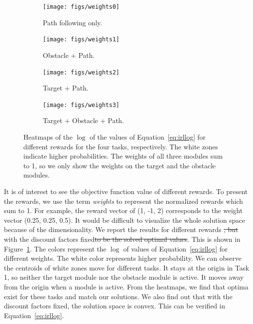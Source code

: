 \documentclass[12pt]{report}	%
\theoremstyle{definition}
\theoremstyle{remark}
\providecommand{\DIFdel}[1]{{\protect\color{red}\sout{#1}}}                      %
\providecommand{\DIFdelbegin}{} %
\providecommand{\DIFdelend}{} %
\providecommand{\DIFaddbeginFL}{} %
\providecommand{\DIFaddendFL}{} %
\providecommand{\DIFdelbeginFL}{} %
\providecommand{\DIFdelendFL}{} %
\begin{document}
\begin{figure}
\centering
\begin{subfigure}[b]{0.49\textwidth}
\DIFdelbeginFL %
\DIFdelendFL \DIFaddbeginFL \texttt{[image: figs/weights0]}
\DIFaddendFL \caption{Path following only.}
\end{subfigure}
\begin{subfigure}[b]{0.49\textwidth}
\DIFdelbeginFL %
\DIFdelendFL \DIFaddbeginFL \texttt{[image: figs/weights1]}
\DIFaddendFL \caption{Obstacle + Path. }
\end{subfigure}
\begin{subfigure}[b]{0.49\textwidth}
\DIFdelbeginFL %
\DIFdelendFL \DIFaddbeginFL \texttt{[image: figs/weights2]}
\DIFaddendFL \caption{Target + Path. }
\end{subfigure}
\begin{subfigure}[b]{0.49\textwidth}
\DIFdelbeginFL %
\DIFdelendFL \DIFaddbeginFL \texttt{[image: figs/weights3]}
\DIFaddendFL \caption{Target + Obstacle + Path. }
\end{subfigure}
\caption{Heatmaps of the $\log$ of the values of Equation~\ref{eq:irllog} for
different rewards for the four tasks, respectively. The white zones indicate
higher probabilities. The weights of all three modules sum to 1, so we only show
the weights on the target and the obstacle modules.
}
\label{fig:heatmap}
\end{figure}

It is of interest to see the objective function value of different rewards. To
present the rewards, we use the term \textit{weights} to represent the
normalized rewards which sum to 1. For example, the reward vector of (1, -1, 2)
corresponds to the weight vector (0.25, 0.25, 0.5). It would be difficult to
visualize the whole solution space because of the dimensionality. We report the
results for different rewards \DIFdelbegin \DIFdel{, but }\DIFdelend with the discount factors fixed\DIFdelbegin \DIFdel{to be the solved optimal
values}\DIFdelend .
This is shown in Figure~\ref{fig:heatmap}. The colors represent the $\log$ of values of
Equation~\ref{eq:irllog} for different weights. The white color represents higher
probability. We can observe the centroids of white zones move for different
tasks. It stays at the origin in Task 1, so neither the target module nor the
obstacle module is active. It moves away from the origin when a module is
active.  From the heatmaps, we find that optima exist for these tasks and match
our solutions. We also find out that with the discount factors fixed, the
solution space is convex. This can be verified in Equation~\ref{eq:irllog}.
\end{document}
